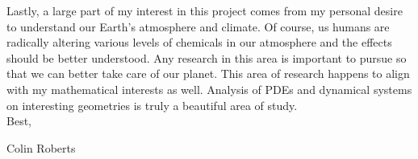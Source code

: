 \documentclass{article}
\begin{document}
Lastly, a large part of my interest in this project comes from my personal desire to understand our Earth's atmosphere and climate.  Of course, us humans are radically altering various levels of chemicals in our atmosphere and the effects should be better understood.  Any research in this area is important to pursue so that we can better take care of our planet. This area of research happens to align with my mathematical interests as well.  Analysis of PDEs and dynamical systems on interesting geometries is truly a beautiful area of study.\\


\noindent Best,

\noindent Colin Roberts
\end{document}
